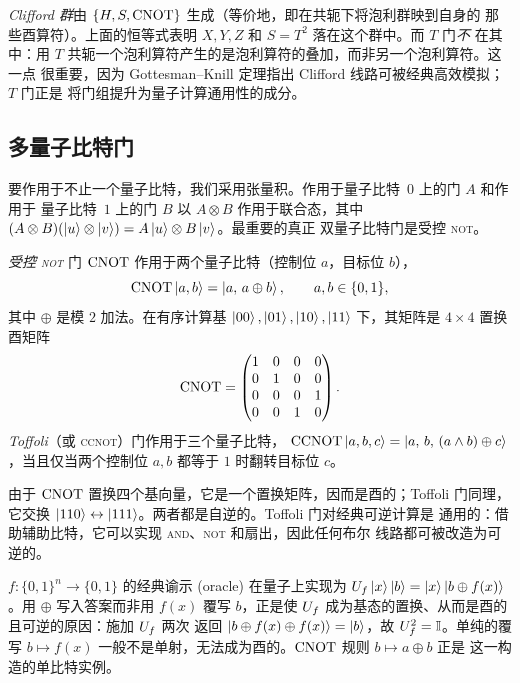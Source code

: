 \begin{remark}[$T$ 是非 Clifford 的]
\emph{Clifford 群}由 $\{H,S,\mathrm{CNOT}\}$ 生成（等价地，即在共轭下将泡利群映到自身的
那些酉算符）。上面的恒等式表明 $X,Y,Z$ 和 $S=T^{2}$ 落在这个群中。而 $T$ 门\emph{不}
在其中：用 $T$ 共轭一个泡利算符产生的是泡利算符的叠加，而非另一个泡利算符。这一点
很重要，因为 Gottesman--Knill 定理指出 Clifford 线路可被经典高效模拟；$T$ 门正是
将门组提升为量子计算通用性的成分。
\end{remark}

\subsection{多量子比特门}

要作用于不止一个量子比特，我们采用张量积。作用于量子比特~$0$ 上的门 $A$ 和作用于
量子比特~$1$ 上的门 $B$ 以 $A\otimes B$ 作用于联合态，其中
$(A\otimes B)(\ket{u}\otimes\ket{v})=A\ket{u}\otimes B\ket{v}$。最重要的真正
双量子比特门是受控 \textsc{not}。

\begin{definition}\label{def:lec01-cnot}
\emph{受控 \textsc{not}} 门 $\mathrm{CNOT}$ 作用于两个量子比特（控制位 $a$，目标位 $b$），
\[
  \mathrm{CNOT}\ket{a,b}=\ket{a,\,a\oplus b},\qquad a,b\in\{0,1\},
\]
其中 $\oplus$ 是模 $2$ 加法。在有序计算基
$\ket{00},\ket{01},\ket{10},\ket{11}$ 下，其矩阵是 $4\times4$ 置换
酉矩阵
\[
  \mathrm{CNOT}=\begin{pmatrix}
    1&0&0&0\\ 0&1&0&0\\ 0&0&0&1\\ 0&0&1&0
  \end{pmatrix}.
\]
\emph{Toffoli}（或 \textsc{ccnot}）门作用于三个量子比特，
$\mathrm{CCNOT}\ket{a,b,c}=\ket{a,\,b,\,(a\wedge b)\oplus c}$，当且仅当两个控制位
$a,b$ 都等于 $1$ 时翻转目标位 $c$。
\end{definition}

由于 $\mathrm{CNOT}$ 置换四个基向量，它是一个置换矩阵，因而是酉的；Toffoli 门同理，它交换
$\ket{110}\leftrightarrow\ket{111}$。两者都是自逆的。Toffoli 门对经典可逆计算是
通用的：借助辅助比特，它可以实现 \textsc{and}、\textsc{not} 和扇出，因此任何布尔
线路都可被改造为可逆的。

\begin{remark}[为何异或保持谕示可逆]
$f:\{0,1\}^{n}\to\{0,1\}$ 的经典谕示 (oracle) 在量子上实现为
$U_{f}\ket{x}\ket{b}=\ket{x}\ket{b\oplus f(x)}$。用 $\oplus$ 写入答案而非用 $f(x)$
覆写 $b$，正是使 $U_{f}$ 成为基态的置换、从而是酉的且可逆的原因：施加 $U_{f}$ 两次
返回 $\ket{b\oplus f(x)\oplus f(x)}=\ket{b}$，故 $U_{f}^{2}=\mathbb{I}$。单纯的覆写
$b\mapsto f(x)$ 一般不是单射，无法成为酉的。$\mathrm{CNOT}$ 规则 $b\mapsto a\oplus b$ 正是
这一构造的单比特实例。
\end{remark}

